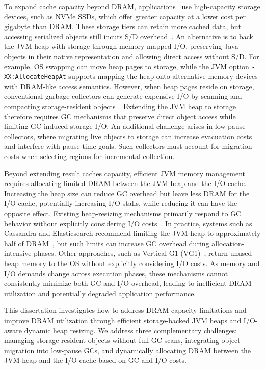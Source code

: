 To expand cache capacity beyond DRAM, applications~\cite{vohra:hbase,zaharia:spark,opensearch:tiered-cache} use high-capacity storage devices, such as NVMe SSDs, which offer greater capacity at a lower cost per gigabyte than DRAM.
These storage tiers can retain more cached data, but accessing serialized objects still incurs S/D overhead~\cite{apapag:fmap,apapag:aquila}.
An alternative is to back the JVM heap with storage through memory-mapped I/O, preserving Java objects in their native representation and allowing direct access without S/D.
For example, OS swapping can move heap pages to storage, while the JVM option \texttt{-XX:AllocateHeapAt} supports mapping the heap onto alternative memory devices with DRAM-like access semantics.
However, when heap pages reside on storage, conventional garbage collectors can generate expensive I/O by scanning and compacting storage-resident objects~\cite{wang:memliner,khanh:polar,teraheap,kolokasis:teracache}.
Extending the JVM heap to storage therefore requires GC mechanisms that preserve direct object access while limiting GC-induced storage I/O.
An additional challenge arises in low-pause collectors, where migrating live objects to storage can increase evacuation costs and interfere with pause-time goals.
Such collectors must account for migration costs when selecting regions for incremental collection.

Beyond extending result caches capacity, efficient JVM memory management requires allocating limited DRAM between the JVM heap and the I/O cache.
Increasing the heap size can reduce GC overhead but leave less DRAM for the I/O cache, potentially increasing I/O stalls, while reducing it can have the opposite effect.
Existing heap-resizing mechanisms primarily respond to GC behavior without explicitly considering I/O costs~\cite{sun:multi_space_heap,wang:elasticMem,boehm:gc,zgc:heap_resize}.
In practice, systems such as Cassandra and Elasticsearch recommend limiting the JVM heap to approximately half of DRAM~\cite{elasticsearch:guidelines,cassandra:guidelines}, but such limits can increase GC overhead during allocation-intensive phases.
Other approaches, such as Vertical G1 (VG1)~\cite{jep351,jep346,wang:elasticMem,bruno:resize}, return unused heap memory to the OS without explicitly considering I/O costs.
As memory and I/O demands change across execution phases, these mechanisms cannot consistently minimize both GC and I/O overhead, leading to inefficient DRAM utilization and potentially degraded application performance.

This dissertation investigates how to address DRAM capacity limitations and improve DRAM utilization through efficient storage-backed JVM heaps and I/O-aware dynamic heap resizing.
We address three complementary challenges: managing storage-resident objects without full GC scans, integrating object migration into low-pause GCs, and dynamically allocating DRAM between the JVM heap and the I/O cache based on GC and I/O costs.

